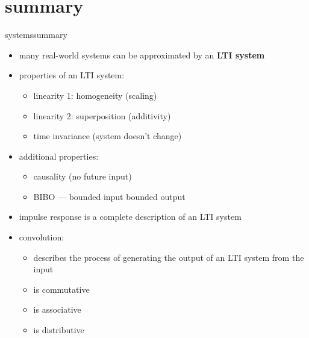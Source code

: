     \section[summary]{summary}
        \begin{frame}{systems}{summary}
            \begin{itemize}
                \item   many real-world systems can be approximated by an \textbf{LTI system}
                \smallskip
                \item<2-> properties of an LTI system:
                    \begin{itemize}
                        \item   linearity 1: homogeneity (scaling)
                        \item   linearity 2: superposition (additivity)
                        \item   time invariance (system doesn't change)
                    \end{itemize}
                \smallskip
                \item<3-> additional properties:
                    \begin{itemize}
                        \item   causality (no future input)
                        \item   BIBO --- bounded input bounded output
                    \end{itemize}
                \smallskip
                \item<4-> impulse response is a complete description of an LTI system
                \smallskip
                \item<5-> convolution:
                    \begin{itemize}
                        \item   describes the process of generating the output of an LTI system from the input
                        \item   is commutative
                        \item   is associative
                        \item   is distributive
                    \end{itemize}
            \end{itemize}
        \end{frame}

    


